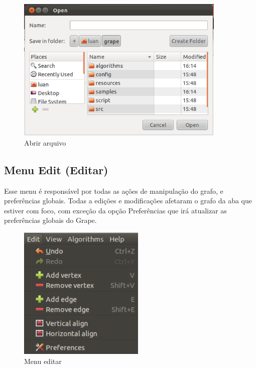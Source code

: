 \documentclass[a4paper]{abnt}
\begin{document}
\begin{figure}[htb]
    \centering
	\includegraphics[width=10cm]{open_dialog.png}
	\caption{Abrir arquivo}
	\label{img_open_dialog}
\end{figure}

\subsection{Menu Edit (Editar)}

Esse menu é responsável por todas as ações de manipulação do grafo, e preferências globais. Todas a edições e modificações afetaram o grafo da aba que estiver com foco, com exceção da opção Preferências que irá atualizar as preferências globais do Grape.
\begin{figure}[htb]
    \centering
	\includegraphics[width=6cm]{grape_menu_edit.png}
	\caption{Menu editar}
	\label{img_menu_edit}
\end{figure}
\end{document}
